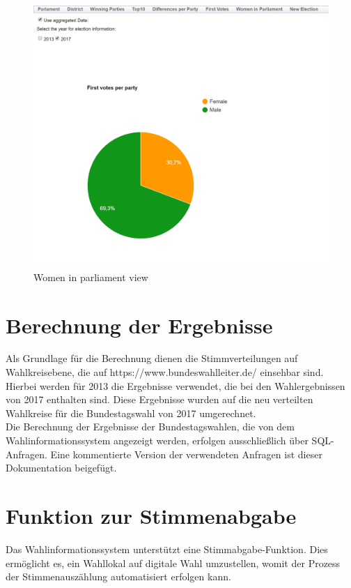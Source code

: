 \documentclass[a4paper]{scrreprt}
\begin{document}
\begin{figure}[H]
\centering
\includegraphics[width=\textwidth]{images/female_in_parliament.png}
\caption {Women in parliament view}
\end{figure}


\section{Berechnung der Ergebnisse}

Als Grundlage für die Berechnung dienen die Stimmverteilungen auf Wahlkreisebene, die auf https://www.bundeswahlleiter.de/ einsehbar sind. Hierbei werden für 2013 die Ergebnisse verwendet, die bei den Wahlergebnissen von 2017 enthalten sind. Diese Ergebnisse wurden auf die neu verteilten Wahlkreise für die Bundestagswahl von 2017 umgerechnet. \\

Die Berechnung der Ergebnisse der Bundestagswahlen, die von dem Wahlinformationssystem angezeigt werden, erfolgen ausschließlich über SQL-Anfragen. Eine kommentierte Version der verwendeten Anfragen ist dieser Dokumentation beigefügt. 


\section{Funktion zur Stimmenabgabe}

Das Wahlinformationssystem unterstützt eine Stimmabgabe-Funktion.
Dies ermöglicht es, ein Wahllokal auf digitale Wahl umzustellen, womit der Prozess der Stimmenauszählung automatisiert erfolgen kann.
\end{document}
